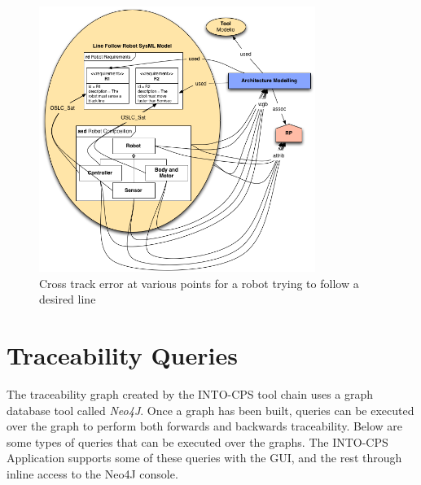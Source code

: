 

\begin{figure}[htbp]
	\centering
	\includegraphics[width=0.8\textwidth]{figures/Traceability/step02}
\caption{Cross track error at various points for a robot trying to follow a desired line}\label{fig:crossTrackError}
\end{figure}




\section{Traceability Queries}


The traceability graph created by the INTO-CPS tool chain uses a graph database tool called \emph{Neo4J}. Once a graph has been built, queries can be executed over the graph to perform both forwards and backwards traceability. Below are some types of queries that can be executed over the graphs. The INTO-CPS Application supports some of these queries with the GUI, and the rest through inline access to the Neo4J console.

